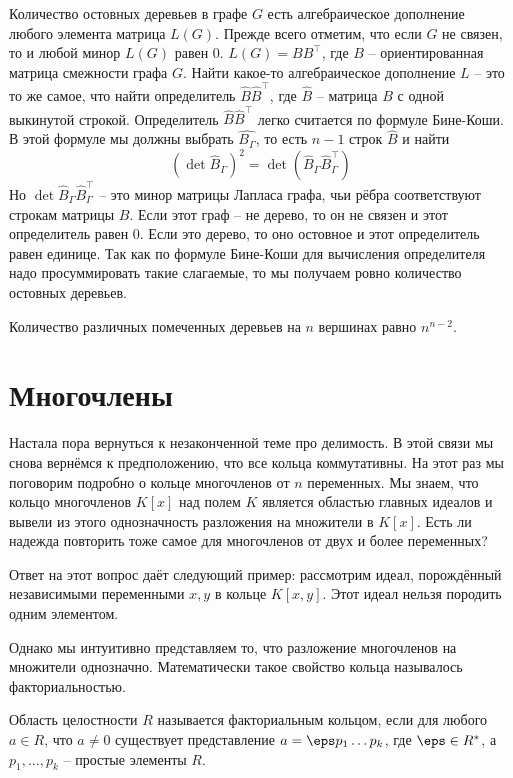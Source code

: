  Количество остовных деревьев в графе $G$ есть алгебраическое дополнение любого элемента матрица $L(G)$.
\ecrl
\proof Прежде всего отметим, что если $G$ не связен, то и любой минор $L(G)$ равен $0$. $L(G)=BB^\top$, где $B$ -- ориентированная матрица смежности графа $G$. Найти какое-то алгебраическое дополнение $L$ -- это то же самое, что найти определитель $\hat{B}\hat{B}^\top$, где $\hat{B}$ -- матрица $B$ с одной выкинутой строкой. Определитель $\hat B \hat{B}^\top$ легко считается по формуле Бине-Коши. В этой формуле мы должны выбрать $\hat{B_{\Gamma}}$, то есть $n-1$ строк $\hat{B}$ и найти
$$(\det \hat{B}_{\Gamma})^2=\det(\hat{B}_{\Gamma} \hat{B}_{\Gamma}^\top)$$
Но $\det \hat{B}_{\Gamma} \hat{B}_{\Gamma}^\top$ -- это минор матрицы Лапласа графа, чьи рёбра соответствуют строкам матрицы $B$. Если этот граф  -- не дерево, то он не связен и этот определитель равен $0$. Если это дерево, то оно остовное и этот определитель равен единице. Так как по формуле Бине-Коши для вычисления определителя надо просуммировать такие слагаемые, то мы получаем ровно количество остовных деревьев.
\endproof


 Количество различных помеченных деревьев на $n$ вершинах равно $n^{n-2}$.
\ecrl


\chapter{Многочлены}

Настала пора вернуться к незаконченной теме про делимость. В этой связи мы снова вернёмся к предположению, что все кольца коммутативны. На этот раз мы поговорим подробно о кольце многочленов от $n$ переменных. Мы знаем, что кольцо многочленов $K[x]$ над полем $K$ является областью главных идеалов и вывели из этого однозначность разложения на множители в $K[x]$. Есть ли надежда повторить тоже самое для многочленов от двух и более переменных? 

Ответ на этот вопрос даёт следующий пример: рассмотрим идеал, порождённый независимыми переменными $x,y$ в кольце $K[x,y]$. Этот идеал нельзя породить одним элементом.

Однако мы интуитивно представляем то, что разложение многочленов на множители однозначно. Математически такое свойство кольца называлось факториальностью.

\dfn
Область целостности $R$ называется факториальным кольцом, если для любого $a\in R$, что $a\neq 0$  существует представление $a=\eps p_1\dots p_k$, где $\eps \in R^*$, а $p_1,\dots,p_k$ -- простые элементы $R$.
\edfn

